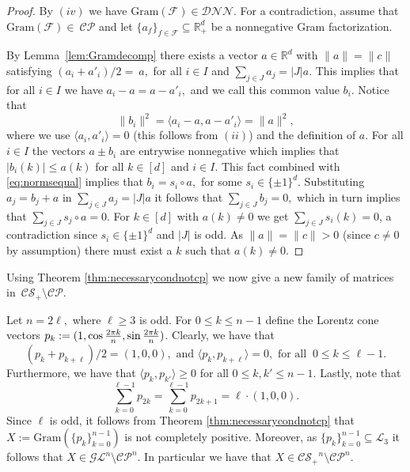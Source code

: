 \documentclass{siamart}
\begin{document}
{{\vspace{0.1cm} 

\begin{proof}
By $(iv)$ we have  ${\mathrm{Gram}}(\mathcal{F})\in {\mathcal{DNN}}$. {For}
 a contradiction, assume   that  ${\mathrm{Gram}}(\mathcal{F})\in~{\mathcal{CP}}$  and let $ \{a_f\}_{f\in {\mathcal{F}}}\subseteq{\mathbb{R}}^d_+$ be a nonnegative   Gram factorization.

By  Lemma~\ref{lem:Gramdecomp} there exists a  vector $a\in {\mathbb{R}}^d$ with ${\|a\| = \|c\|}$ satisfying   $(a_{
i}+a'_{i})/2=~
a,$ for all $i\in I$ and $\sum_{j\in J}a_j=\lvert J\rvert a$.  This implies that for all $i\in I$ we have
$a_i-a=a-a'_{i},$ and we call this common value $b_i$. Notice that
\begin{equation}\label{eq:normsequal}
\|b_i\|^2={\langle} a_i-a,a-a'_{i}{\rangle}=\|a\|^2,
\end{equation}
where we use ${\langle} a_i, a'_{i}{\rangle}=0$ (this follows from $(ii)$) and the definition of $a$. For all $i\in I$  the vectors  $a\pm b_i$ are  entrywise nonnegative which  implies that $|b_i(k)|\le a(k)$ for all $k\in [d]$ and $i\in I$. This fact combined with \eqref{eq:normsequal} implies that $b_i=s_i\circ a,$ for some  $s_i \in \{\pm1\}^d$. { Substituting $a_j=b_j+a$ in $\sum_{j\in J}a_j=\lvert J\rvert a$ it follows that $\sum_{j\in J }b_j=0,$ which in turn  implies that
$\sum_{j\in J} s_j\circ a=0$.  For  $k\in [d]$ with  $a(k)\ne 0$   we get  $\sum_{j\in J}s_i(k)=0$, a contradiction since $s_i \in \{\pm1\}^d$ and  $|J|$ is odd.} {As $\| a \| = \| c \| > 0$ (since $c \neq 0$ by assumption) there must exist a $k$ such that $a(k) \neq 0$.}
\end{proof}
\vspace{0.1cm} 

Using Theorem \ref{thm:necessarycondnotcp} we now give a new  family  of matrices in~${\mathcal{CS}_+}
\setminus {\mathcal{CP}}$.
\medskip
\begin{corollary}\label{cor:cpsdsetminuscp}
Let $n=2\ell,$ where {$\ell \geq 3$} is odd.
For  $0\le k\le n-1$ define the Lorentz cone vectors $p_k:=(1,\cos {2\pi k\over n},\sin {2\pi k\over n})$.
Clearly,  we have that
$$(p_k+p_{k+\ell})/2=(1,0,0), \text{ and }   {\langle} p_k,p_{k+\ell}{\rangle}=0,  \text{ for all }\  0\le k \le \ell -1.$$
Furthermore, we have  that ${\langle} p_k,p_{k'}{\rangle}\ge 0$ for all $0\le k,k'\le n-1$. Lastly,
note that
$$\sum_{k=0}^{\ell-1} p_{2k}=\sum_{k=0}^{\ell-1} p_{2k+1}=\ell \cdot (1,0,0).$$
Since $\ell$ is odd, it follows from   Theorem \ref{thm:necessarycondnotcp} that $X:={\mathrm{Gram}}(\{p_k\}_{k=0}^{n-1})$ is not completely positive. Moreover, as  $\{p_k\}_{k=0}^{n-1}\subseteq {\mathcal{L}}_3$  it follows that $X\in {\mathcal{GL}}^n {\setminus {\mathcal{CP}}^n}$. In particular we have that $X\in {\mathcal{CS}_+}^n {\setminus {\mathcal{CP}}^n}
$.
\end{corollary}

}}
\end{document}
